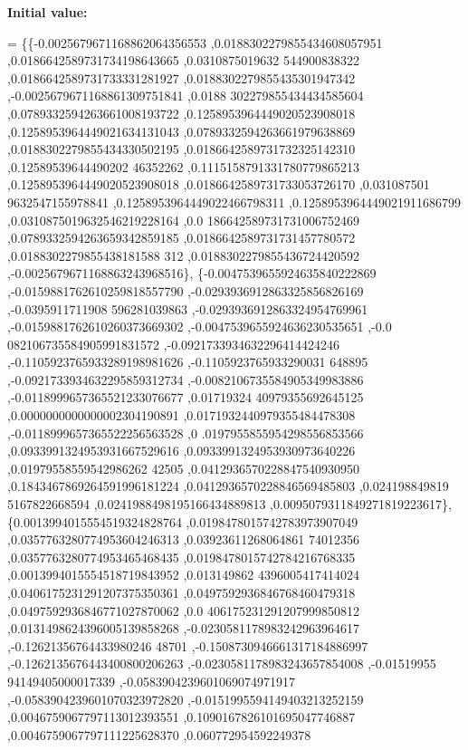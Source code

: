 {\bfseries Initial value\+:}
\begin{DoxyCode}
= \{\{-0.0025679671168862064356553 ,0.0188302279855434608057951 ,0.0186642589731734198643665 ,0.0310875019632
      544900838322 ,0.0186642589731733331281927 ,0.0188302279855435301947342 ,-0.0025679671168861309751841 ,0.0188
      302279855434434585604 ,0.0789332594263661008193722 ,0.1258953964449020523908018 ,0.1258953964449021634131043
       ,0.0789332594263661979638869 ,0.0188302279855434330502195 ,0.0186642589731732325142310 ,0.12589539644490202
      46352262 ,0.1115158791331780779865213 ,0.1258953964449020523908018 ,0.0186642589731733053726170 ,0.031087501
      9632547155978841 ,0.1258953964449022466798311 ,0.1258953964449021911686799 ,0.0310875019632546219228164 ,0.0
      186642589731731006752469 ,0.0789332594263659342859185 ,0.0186642589731731457780572 ,0.0188302279855438181588
      312 ,0.0188302279855436724420592 ,-0.0025679671168863243968516\},
\{-0.0047539655924635840222869 ,-0.0159881762610259818557790 ,-0.0293936912863325856826169 ,-0.0395911711908
      596281039863 ,-0.0293936912863324954769961 ,-0.0159881762610260373669302 ,-0.0047539655924636230535651 ,-0.0
      082106735584905991831572 ,-0.0921733934632296414424246 ,-0.1105923765933289198981626 ,-0.1105923765933290031
      648895 ,-0.0921733934632295859312734 ,-0.0082106735584905349983886 ,-0.0118999657365521233076677 ,0.01719324
      40979355692645125 ,0.0000000000000002304190891 ,0.0171932440979355484478308 ,-0.0118999657365522256563528 ,0
      .0197955855954298556853566 ,0.0933991324953931667529616 ,0.0933991324953930973640226 ,0.01979558559542986262
      42505 ,0.0412936570228847540930950 ,0.1843467869264591996181224 ,0.0412936570228846569485803 ,0.024198849819
      5167822668594 ,0.0241988498195166434889813 ,0.0095079311849271819223617\},
\{0.0013994015554519324828764 ,0.0198478015742783973907049 ,0.0357763280774953604246313 ,0.03923611268064861
      74012356 ,0.0357763280774953465468435 ,0.0198478015742784216768335 ,0.0013994015554518719843952 ,0.013149862
      4396005417414024 ,0.0406175231291207375350361 ,0.0497592936846768460479318 ,0.0497592936846771027870062 ,0.0
      406175231291207999850812 ,0.0131498624396005139858268 ,-0.0230581178983242963964617 ,-0.12621356764433980246
      48701 ,-0.1508730946661317184886997 ,-0.1262135676443400800206263 ,-0.0230581178983243657854008 ,-0.01519955
      94149405000017339 ,-0.0583904239601069074971917 ,-0.0583904239601070323972820 ,-0.0151995594149403213252159 
      ,0.0046759067797113012393551 ,0.1090167826101695047746887 ,0.0046759067797111225628370 ,0.060772954592249378

\end{DoxyCode}

